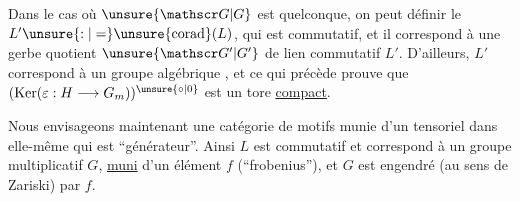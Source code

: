 
Dans le cas où $\unsure{\mathscr G|G}$ est quelconque, on peut définir  le  $L'\unsure{:|=}\unsure{\operatorname{corad}}(L)$, qui est commutatif, et il correspond à une gerbe quotient $\unsure{\mathscr G'|G'}$ de lien commutatif $L'$. D'ailleurs, $L'$ correspond à un groupe algébrique , et ce qui précède prouve que $(\operatorname{Ker}(\varepsilon:H\longrightarrow G_m))^{\unsure{\circ|0}}$ est un tore \uline{compact}.


Nous envisageons maintenant une  catégorie de motifs munie d'un   tensoriel dans elle-même qui est ``générateur''. Ainsi $L$ est commutatif et correspond à un groupe    multiplicatif $G$, \uline{muni} d'un élément $f$ (``frobenius''), et $G$ est engendré (au sens de Zariski) par $f$.  


